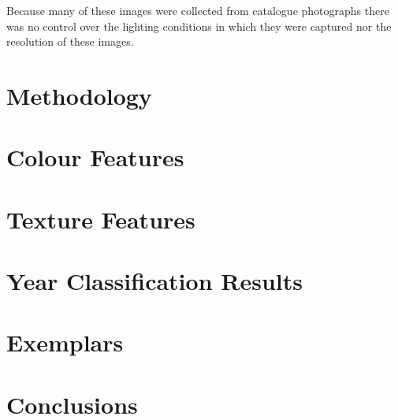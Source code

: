 \documentclass[a4,portrait]{template/a0poster}
\begin{document}
\begin{multicols}{2}
Because many of these images were collected from catalogue photographs there
was no control over the lighting conditions in which they were captured nor the
resolution of these images.

\section*{Methodology}

\section*{Colour Features}

\section*{Texture Features}

\section*{Year Classification Results}

\section*{Exemplars}

\section*{Conclusions}

\end{multicols}
\end{document}
